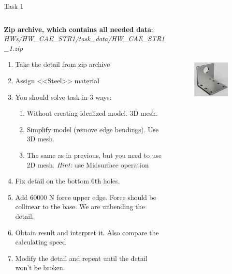 \documentclass[aspectratio=169]{beamer}
\begin{document}
\begin{frame}[t]{Task 1}
    \vspace{-0.4cm}
    \begin{columns}[T,onlytextwidth]
        \begin{column}{0.59\textwidth}
            \scriptsize
            \textbf{Zip archive, which contains all needed data}: \textit{HWs/HW\_CAE\_STR1/task\_data/HW\_CAE\_STR1\_1.zip}
            \begin{enumerate}
                \item Take the detail from zip archive
                \item Assign <<Steel>> material
                \item You should solve task in 3 ways:
                \begin{enumerate}
                    \scriptsize
                    \item Without creating idealized model. 3D mesh.
                    \item Simplify model (remove edge bendings). Use 3D mesh.
                    \item The same as in previous, but you need to use 2D mesh. \textit{Hint:} use Midsurface operation 
                \end{enumerate}
                \item Fix detail on the bottom 6th holes.
                \item Add 60000 N force  upper edge. Force should be collinear to the base. We are unbending the detail.
                \item Obtain result and interpret it. Also compare the calculating speed
                \item Modify the detail and repeat until the detail won't be broken.
            \end{enumerate}
        \end{column}
        \begin{column}{0.39\textwidth}
            \begin{figure}[H]
                \centering\includegraphics[height=6cm,width=1\textwidth,keepaspectratio]{HW_CAE_STR1_1.png}
                \label{fig:HW_CAE_STR1_1.png}
            \end{figure}
        \end{column}
    \end{columns}
\end{frame}
\end{document}
